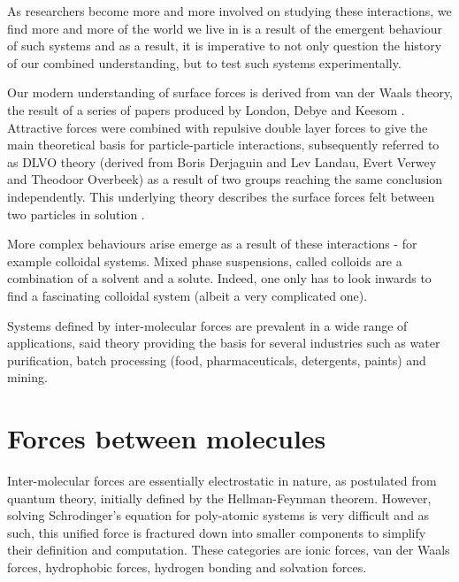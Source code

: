 As %
researchers become
more and more involved on 
studying these interactions,
 we find more and more of the world we live in is 
a result of the emergent behaviour of such systems and as a result, it is imperative to not only question the history of our combined understanding, but to test such systems experimentally.

Our modern understanding of surface forces is derived from van der Waals 
theory,
the result of a series of papers produced by London, Debye and Keesom \cite{AFMvdW}. %
Attractive forces were combined with repulsive double layer forces to %
give the main theoretical basis %
for particle-particle interactions, %
subsequently %
referred to as DLVO theory (derived from Boris Derjaguin and Lev Landau, Evert Verwey and Theodoor Overbeek) as a result of two groups reaching the same conclusion independently\cite{Verwey}\cite{DERJAGUIN}. This underlying theory describes the %
surface forces felt between two particles in solution .

More complex behaviours arise emerge as a result of these interactions - for example %
colloidal systems. Mixed phase suspensions, called colloids are a combination of a solvent and a solute. Indeed, one only has to look inwards to find a fascinating colloidal system (albeit a very complicated one). \cite{surfThesis} \cite{christian2018a}

Systems defined by inter-molecular forces are prevalent in a wide range of applications, said theory providing the basis for several industries such as water purification, batch processing (food, pharmaceuticals, detergents, paints) and mining.\cite{TABOR19772}


\section{Forces between molecules}

Inter-molecular forces are essentially electrostatic in nature, as postulated from quantum theory, initially defined by the Hellman-Feynman theorem. %
However, %
solving Schrodinger's equation for poly-atomic systems is very difficult and as such, this unified force is fractured down into smaller %
components to simplify their definition and %
computation. These categories are %
ionic forces, van der Waals forces, hydrophobic forces, hydrogen bonding and solvation forces. 


